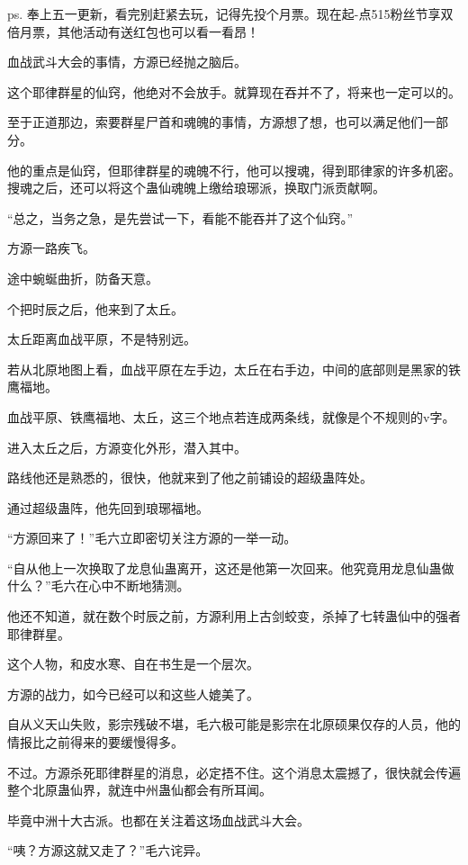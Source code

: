 
\begin{this_body}

ps. 奉上五一更新，看完别赶紧去玩，记得先投个月票。现在起-点515粉丝节享双倍月票，其他活动有送红包也可以看一看昂！

血战武斗大会的事情，方源已经抛之脑后。

这个耶律群星的仙窍，他绝对不会放手。就算现在吞并不了，将来也一定可以的。

至于正道那边，索要群星尸首和魂魄的事情，方源想了想，也可以满足他们一部分。

他的重点是仙窍，但耶律群星的魂魄不行，他可以搜魂，得到耶律家的许多机密。搜魂之后，还可以将这个蛊仙魂魄上缴给琅琊派，换取门派贡献啊。

“总之，当务之急，是先尝试一下，看能不能吞并了这个仙窍。”

方源一路疾飞。

途中蜿蜒曲折，防备天意。

个把时辰之后，他来到了太丘。

太丘距离血战平原，不是特别远。

若从北原地图上看，血战平原在左手边，太丘在右手边，中间的底部则是黑家的铁鹰福地。

血战平原、铁鹰福地、太丘，这三个地点若连成两条线，就像是个不规则的v字。

进入太丘之后，方源变化外形，潜入其中。

路线他还是熟悉的，很快，他就来到了他之前铺设的超级蛊阵处。

通过超级蛊阵，他先回到琅琊福地。

“方源回来了！”毛六立即密切关注方源的一举一动。

“自从他上一次换取了龙息仙蛊离开，这还是他第一次回来。他究竟用龙息仙蛊做什么？”毛六在心中不断地猜测。

他还不知道，就在数个时辰之前，方源利用上古剑蛟变，杀掉了七转蛊仙中的强者耶律群星。

这个人物，和皮水寒、自在书生是一个层次。

方源的战力，如今已经可以和这些人媲美了。

自从义天山失败，影宗残破不堪，毛六极可能是影宗在北原硕果仅存的人员，他的情报比之前得来的要缓慢得多。

不过。方源杀死耶律群星的消息，必定捂不住。这个消息太震撼了，很快就会传遍整个北原蛊仙界，就连中州蛊仙都会有所耳闻。

毕竟中洲十大古派。也都在关注着这场血战武斗大会。

“咦？方源这就又走了？”毛六诧异。


\end{this_body}
